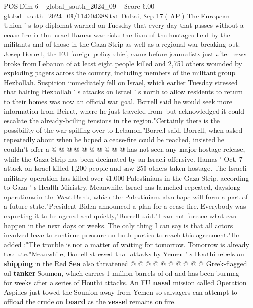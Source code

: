 \begin{textsample}{POS Dim 6 – global\_south\_2024\_09 – Score 6.00 – global\_south\_2024\_09/114304388.txt}  \label{ex:f6_pos_418}
Dubai, Sep 17 ( AP ) The European Union ' s top diplomat warned on Tuesday that every day that passes without a cease-fire in the Israel-Hamas war risks the lives of the hostages held by the militants and of those in the Gaza Strip as well as a regional war breaking out.
Josep Borrell, the EU foreign policy chief, came before journalists just after news broke from Lebanon of at least eight people killed and 2,750 others wounded by exploding pagers across the country, including members of the militant group Hezbollah.
Suspicion immediately fell on Israel, which earlier Tuesday stressed that halting Hezbollah ' s attacks on Israel ' s north to allow residents to return to their homes was now an official war goal.
Borrell said he would seek more information from Beirut, where he just traveled from, but acknowledged it could escalate the already-boiling tensions in the region."Certainly there is the possibility of the war spilling over to Lebanon,"Borrell said.
Borrell, when asked repeatedly about when he hoped a cease-fire could be reached, insisted he couldn't offer a @ @ @ @ @ @ @ @ @ @ has not seen any major hostage release, while the Gaza Strip has been decimated by an Israeli offensive.
Hamas ' Oct. 7 attack on Israel killed 1,200 people and saw 250 others taken hostage.
The Israeli military operation has killed over 41,000 Palestinians in the Gaza Strip, according to Gaza ' s Health Ministry.
Meanwhile, Israel has launched repeated, dayslong operations in the West Bank, which the Palestinians also hope will form a part of a future state."President Biden announced a plan for a cease-fire.
Everybody was expecting it to be agreed and quickly,"Borrell said."I can not foresee what can happen in the next days or weeks.
The only thing I can say is that all actors involved have to continue pressure on both parties to reach this agreement."He added :"The trouble is not a matter of waiting for tomorrow.
Tomorrow is already too late."Meanwhile, Borrell stressed that attacks by Yemen ' s Houthi rebels on \textbf{shipping} in the Red \textbf{Sea} also threatened @ @ @ @ @ @ @ @ @ @ Greek-flagged oil \textbf{tanker} Sounion, which carries 1 million barrels of oil and has been burning for weeks after a series of Houthi attacks.
An EU \textbf{naval} mission called Operation Aspides just towed the Sounion away from Yemen so salvagers can attempt to offload the crude on \textbf{board} as the \textbf{vessel} remains on fire.

\end{textsample}
